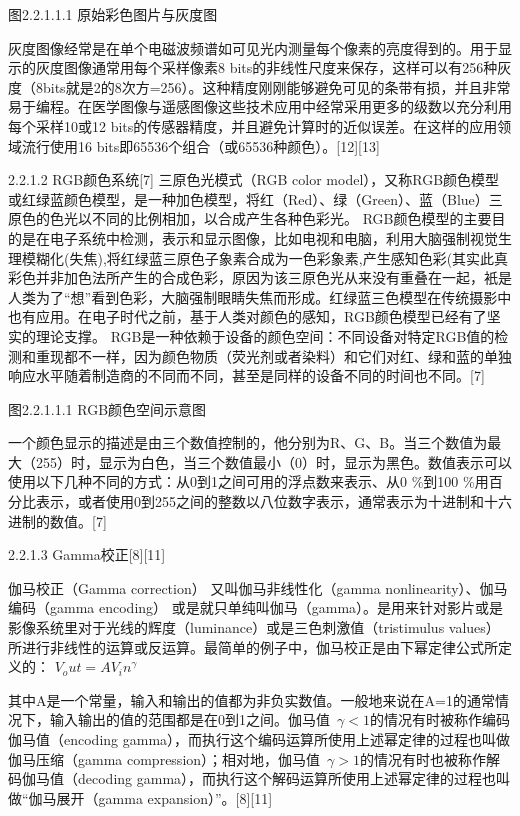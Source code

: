 图2.2.1.1.1 原始彩色图片与灰度图

灰度图像经常是在单个电磁波频谱如可见光内测量每个像素的亮度得到的。用于显示的灰度图像通常用每个采样像素8 bits的非线性尺度来保存，这样可以有256种灰度（8bits就是2的8次方=256）。这种精度刚刚能够避免可见的条带有损，并且非常易于编程。在医学图像与遥感图像这些技术应用中经常采用更多的级数以充分利用每个采样10或12 bits的传感器精度，并且避免计算时的近似误差。在这样的应用领域流行使用16 bits即65536个组合（或65536种颜色）。[12][13]

2.2.1.2 RGB颜色系统[7]
	三原色光模式（RGB color model），又称RGB颜色模型或红绿蓝颜色模型，是一种加色模型，将红（Red）、绿（Green）、蓝（Blue）三原色的色光以不同的比例相加，以合成产生各种色彩光。
RGB颜色模型的主要目的是在电子系统中检测，表示和显示图像，比如电视和电脑，利用大脑强制视觉生理模糊化(失焦),将红绿蓝三原色子象素合成为一色彩象素,产生感知色彩(其实此真彩色并非加色法所产生的合成色彩，原因为该三原色光从来没有重叠在一起，衹是人类为了“想”看到色彩，大脑强制眼睛失焦而形成。红绿蓝三色模型在传统摄影中也有应用。在电子时代之前，基于人类对颜色的感知，RGB颜色模型已经有了坚实的理论支撑。
RGB是一种依赖于设备的颜色空间：不同设备对特定RGB值的检测和重现都不一样，因为颜色物质（荧光剂或者染料）和它们对红、绿和蓝的单独响应水平随着制造商的不同而不同，甚至是同样的设备不同的时间也不同。[7]
     
图2.2.1.1.1 RGB颜色空间示意图

一个颜色显示的描述是由三个数值控制的，他分别为R、G、B。当三个数值为最大（255）时，显示为白色，当三个数值最小（0）时，显示为黑色。数值表示可以使用以下几种不同的方式：从0到1之间可用的浮点数来表示、从0 \%到100 \%用百分比表示，或者使用0到255之间的整数以八位数字表示，通常表示为十进制和十六进制的数值。[7]

2.2.1.3 Gamma校正[8][11]
	
	伽马校正（Gamma correction） 又叫伽马非线性化（gamma nonlinearity）、伽马编码（gamma encoding） 或是就只单纯叫伽马（gamma）。是用来针对影片或是影像系统里对于光线的辉度（luminance）或是三色刺激值（tristimulus values）所进行非线性的运算或反运算。最简单的例子中，伽马校正是由下幂定律公式所定义的：
$V_out=AV_in^\gamma$
	
	其中A是一个常量，输入和输出的值都为非负实数值。一般地来说在A=1的通常情况下，输入输出的值的范围都是在0到1之间。伽马值~$\gamma < 1$的情况有时被称作编码伽马值（encoding gamma），而执行这个编码运算所使用上述幂定律的过程也叫做伽马压缩（gamma compression）；相对地，伽马值~$\gamma > 1$的情况有时也被称作解码伽马值（decoding gamma），而执行这个解码运算所使用上述幂定律的过程也叫做“伽马展开（gamma expansion）”。[8][11]
	
